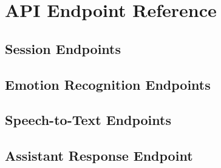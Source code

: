 \chapter{API Endpoint Reference}

\section{Session Endpoints}

\section{Emotion Recognition Endpoints}

\section{Speech-to-Text Endpoints}

\section{Assistant Response Endpoint}
